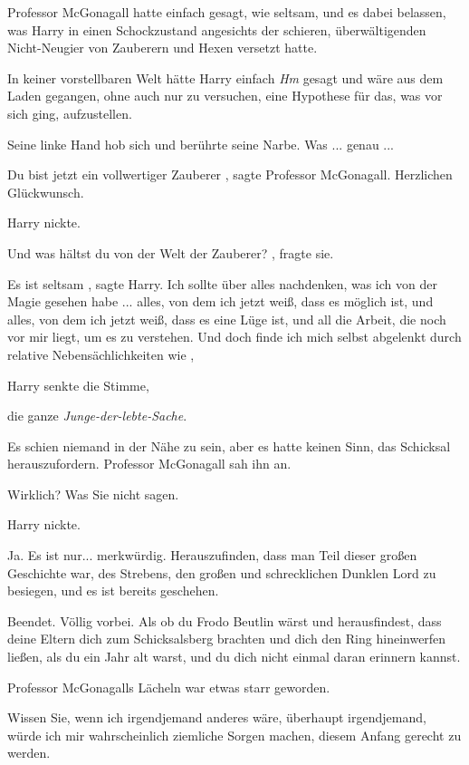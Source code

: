 Professor McGonagall hatte einfach gesagt, wie seltsam, und es dabei belassen,
was Harry in einen Schockzustand angesichts der schieren, überwältigenden
Nicht-Neugier von Zauberern und Hexen versetzt hatte.

In keiner vorstellbaren Welt hätte Harry einfach \glqq \emph{Hm}\grqq{} gesagt
und wäre aus dem Laden gegangen, ohne auch nur zu versuchen, eine Hypothese
für das, was vor sich ging, aufzustellen.

Seine linke Hand hob sich und berührte seine Narbe. Was ... genau ...

\glqq Du bist jetzt ein vollwertiger Zauberer\grqq{} , sagte Professor
McGonagall. \glqq Herzlichen Glückwunsch.\grqq{}

Harry nickte.

\glqq Und was hältst du von der Welt der Zauberer?\grqq{} , fragte sie.

\glqq Es ist seltsam\grqq{} , sagte Harry. \glqq Ich sollte über alles
nachdenken, was ich von der Magie gesehen habe ... alles, von dem ich jetzt
weiß, dass es möglich ist, und alles, von dem ich jetzt weiß, dass es eine
Lüge ist, und all die Arbeit, die noch vor mir liegt, um es zu verstehen.
Und doch finde ich mich selbst abgelenkt durch relative Nebensächlichkeiten
wie\grqq{} ,

Harry senkte die Stimme,

\glqq die ganze \emph{Junge-der-lebte-Sache}.\grqq{}

Es schien niemand in der Nähe zu sein, aber es hatte keinen Sinn, das Schicksal
herauszufordern. Professor McGonagall sah ihn an.

\glqq Wirklich? Was Sie nicht sagen.\grqq{}

Harry nickte.

\glqq Ja. Es ist nur... merkwürdig. Herauszufinden, dass man Teil dieser großen
Geschichte war, des Strebens, den großen und schrecklichen Dunklen Lord zu
besiegen, und es ist bereits geschehen.

Beendet. Völlig vorbei. Als ob du Frodo Beutlin wärst und herausfindest, dass
deine Eltern dich zum Schicksalsberg brachten und dich den Ring hineinwerfen
ließen, als du ein Jahr alt warst, und du dich nicht einmal daran erinnern
kannst.\grqq{}

Professor McGonagalls Lächeln war etwas starr geworden.

\glqq Wissen Sie, wenn ich irgendjemand anderes wäre, überhaupt irgendjemand,
würde ich mir wahrscheinlich ziemliche Sorgen machen, diesem Anfang gerecht
zu werden.

